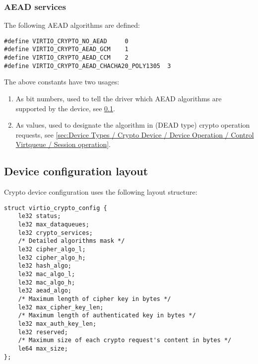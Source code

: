 \subsubsection{AEAD services}\label{sec:Device Types / Crypto Device / Supported crypto services / AEAD services}

The following AEAD algorithms are defined:

\begin{lstlisting}
#define VIRTIO_CRYPTO_NO_AEAD     0
#define VIRTIO_CRYPTO_AEAD_GCM    1
#define VIRTIO_CRYPTO_AEAD_CCM    2
#define VIRTIO_CRYPTO_AEAD_CHACHA20_POLY1305  3
\end{lstlisting}

The above constants have two usages:
\begin{enumerate}
\item As bit numbers, used to tell the driver which AEAD algorithms
are supported by the device, see \ref{sec:Device Types / Crypto Device / Device configuration layout}.
\item As values, used to designate the algorithm in (DEAD type) crypto
operation requests, see \ref{sec:Device Types / Crypto Device / Device Operation / Control Virtqueue / Session operation}.
\end{enumerate}

\subsection{Device configuration layout}\label{sec:Device Types / Crypto Device / Device configuration layout}

Crypto device configuration uses the following layout structure:

\begin{lstlisting}
struct virtio_crypto_config {
    le32 status;
    le32 max_dataqueues;
    le32 crypto_services;
    /* Detailed algorithms mask */
    le32 cipher_algo_l;
    le32 cipher_algo_h;
    le32 hash_algo;
    le32 mac_algo_l;
    le32 mac_algo_h;
    le32 aead_algo;
    /* Maximum length of cipher key in bytes */
    le32 max_cipher_key_len;
    /* Maximum length of authenticated key in bytes */
    le32 max_auth_key_len;
    le32 reserved;
    /* Maximum size of each crypto request's content in bytes */
    le64 max_size;
};
\end{lstlisting}


